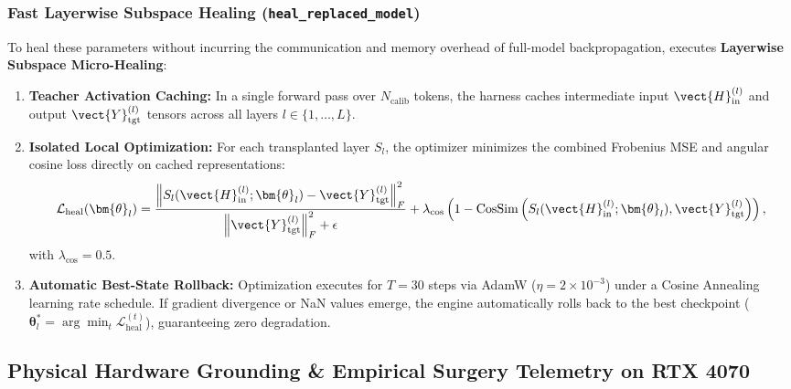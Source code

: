 \subsubsection{Fast Layerwise Subspace Healing (\texttt{heal\_replaced\_model})}
To heal these parameters without incurring the communication and memory overhead of full-model backpropagation, \neuralops{} executes \textbf{Layerwise Subspace Micro-Healing}:
\begin{enumerate}
    \item \textbf{Teacher Activation Caching:} In a single forward pass over $N_{\text{calib}}$ tokens, the harness caches intermediate input $\vect{H}_{\text{in}}^{(l)}$ and output $\vect{Y}_{\text{tgt}}^{(l)}$ tensors across all layers $l \in \{1, \dots, L\}$.
    \item \textbf{Isolated Local Optimization:} For each transplanted layer $S_l$, the optimizer minimizes the combined Frobenius MSE and angular cosine loss directly on cached representations:
    \begin{equation}
    \label{eq:healing_loss}
    \mathcal{L}_{\text{heal}}(\bm{\theta}_l) = \frac{\left\| S_l(\vect{H}_{\text{in}}^{(l)}; \bm{\theta}_l) - \vect{Y}_{\text{tgt}}^{(l)} \right\|_F^2}{\left\| \vect{Y}_{\text{tgt}}^{(l)} \right\|_F^2 + \epsilon} + \lambda_{\text{cos}} \left( 1 - \operatorname{CosSim}\left( S_l(\vect{H}_{\text{in}}^{(l)}; \bm{\theta}_l), \vect{Y}_{\text{tgt}}^{(l)} \right) \right),
    \end{equation}
    with $\lambda_{\text{cos}} = 0.5$.
    \item \textbf{Automatic Best-State Rollback:} Optimization executes for $T=30$ steps via AdamW ($\eta = 2\times 10^{-3}$) under a Cosine Annealing learning rate schedule. If gradient divergence or NaN values emerge, the engine automatically rolls back to the best checkpoint ($\bm{\theta}_l^* = \arg\min_t \mathcal{L}_{\text{heal}}^{(t)}$), guaranteeing zero degradation.
\end{enumerate}

\subsection{Physical Hardware Grounding \& Empirical Surgery Telemetry on RTX 4070}
\label{sec:surgery_hardware_telemetry}

